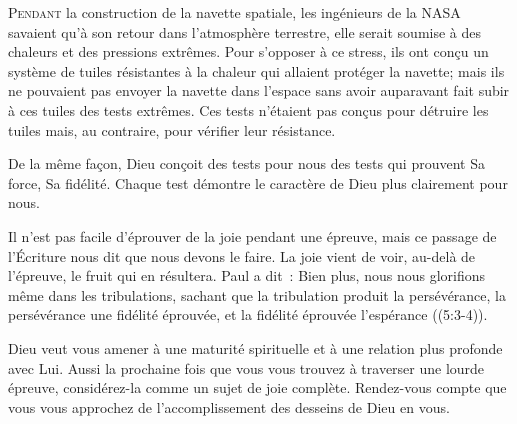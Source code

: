 \dvrule






\lettrine{P}{endant} la construction de la navette spatiale,
 les ingénieurs de la NASA savaient qu'à son retour
 dans l'atmosphère terrestre, elle serait soumise à des chaleurs
 et des pressions extrêmes.
 Pour s'opposer à ce stress, ils ont con\c{c}u un système de tuiles
 résistantes à la chaleur qui allaient protéger la navette;
 mais ils ne pouvaient pas envoyer la navette dans l'espace
 sans avoir auparavant fait subir à ces tuiles des tests extrêmes.
 Ces tests n'étaient pas con\c{c}us pour détruire les tuiles mais,
 au contraire, pour vérifier leur résistance. 

De la même fa\c{c}on, Dieu con\c{c}oit des tests pour nous \ocadr des tests
 qui prouvent Sa force, Sa fidélité. Chaque test démontre
 le caractère de Dieu plus clairement pour nous. 


Il n'est pas facile d'éprouver de la joie pendant une épreuve,
 mais ce passage de l'Écriture nous dit que nous devons le faire.
 La joie vient de voir, au-delà de l'épreuve, le fruit qui en résultera.
 Paul a dit~: 
 \Og Bien plus, nous nous glorifions même dans les tribulations,
 sachant que la tribulation produit la persévérance,
 la persévérance une fidélité éprouvée,
 et la fidélité éprouvée l'espérance \Fg{} ((5:3-4)). 

Dieu veut vous amener à une maturité spirituelle et à une relation
 plus profonde avec Lui. Aussi la prochaine fois que vous vous trouvez
 à traverser une lourde épreuve, considérez-la 
 comme un sujet de joie complète.
 Rendez-vous compte que vous vous approchez de l'accomplissement
 des desseins de Dieu en vous. 

\dvrule




